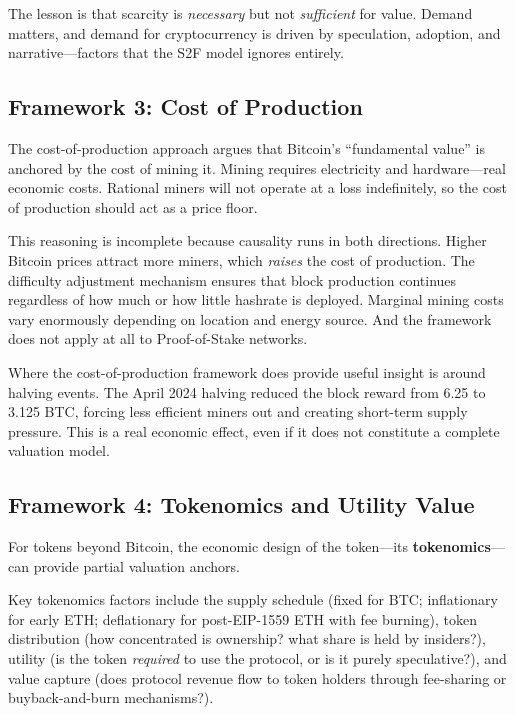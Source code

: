 \documentclass[11pt,a4paper]{article}
\newcommand{\keyword}[1]{\textbf{\textcolor{AccentOrange}{#1}}}
\begin{document}
The lesson is that scarcity is \textit{necessary} but not \textit{sufficient} for value. Demand matters, and demand for cryptocurrency is driven by speculation, adoption, and narrative---factors that the S2F model ignores entirely.

\subsection{Framework 3: Cost of Production}

The cost-of-production approach argues that Bitcoin's ``fundamental value'' is anchored by the cost of mining it. Mining requires electricity and hardware---real economic costs. Rational miners will not operate at a loss indefinitely, so the cost of production should act as a price floor.

This reasoning is incomplete because causality runs in both directions. Higher Bitcoin prices attract more miners, which \textit{raises} the cost of production. The difficulty adjustment mechanism ensures that block production continues regardless of how much or how little hashrate is deployed. Marginal mining costs vary enormously depending on location and energy source. And the framework does not apply at all to Proof-of-Stake networks.

Where the cost-of-production framework does provide useful insight is around halving events. The April 2024 halving reduced the block reward from 6.25 to 3.125 BTC, forcing less efficient miners out and creating short-term supply pressure. This is a real economic effect, even if it does not constitute a complete valuation model.

\subsection{Framework 4: Tokenomics and Utility Value}

For tokens beyond Bitcoin, the economic design of the token---its \keyword{tokenomics}---can provide partial valuation anchors.

Key tokenomics factors include the supply schedule (fixed for BTC; inflationary for early ETH; deflationary for post-EIP-1559 ETH with fee burning), token distribution (how concentrated is ownership? what share is held by insiders?), utility (is the token \textit{required} to use the protocol, or is it purely speculative?), and value capture (does protocol revenue flow to token holders through fee-sharing or buyback-and-burn mechanisms?).
\end{document}
